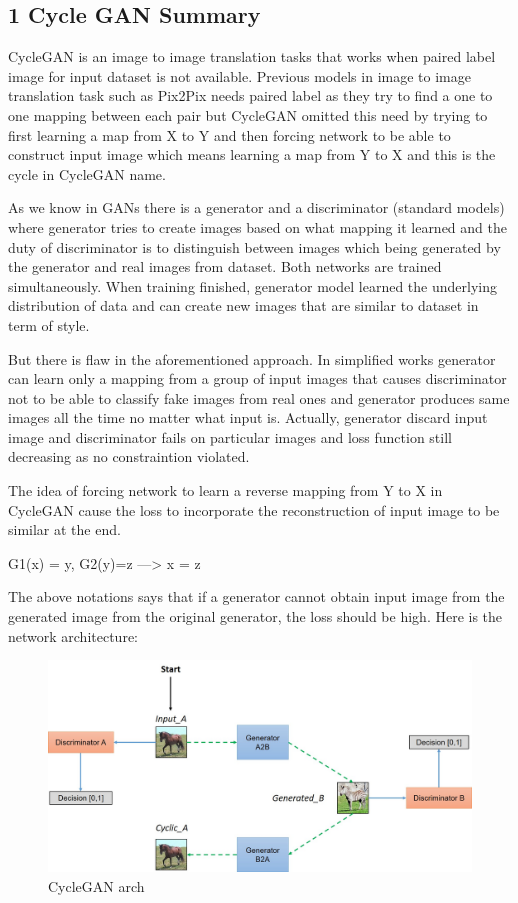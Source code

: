\documentclass[11pt]{article}
\makeatletter
\def\maxwidth{\ifdim\Gin@nat@width>\linewidth\linewidth
    \else\Gin@nat@width\fi}
\let\Oldincludegraphics\includegraphics
\renewcommand{\includegraphics}[1]{\Oldincludegraphics[width=.8\maxwidth]{#1}}
\makeatother
\begin{document}
    \hypertarget{cycle-gan-summary}{%
\subsection{1 Cycle GAN Summary}\label{cycle-gan-summary}}

CycleGAN is an image to image translation tasks that works when paired
label image for input dataset is not available. Previous models in image
to image translation task such as Pix2Pix needs paired label as they try
to find a one to one mapping between each pair but CycleGAN omitted this
need by trying to first learning a map from X to Y and then forcing
network to be able to construct input image which means learning a map
from Y to X and this is the cycle in CycleGAN name.

As we know in GANs there is a generator and a discriminator (standard
models) where generator tries to create images based on what mapping it
learned and the duty of discriminator is to distinguish between images
which being generated by the generator and real images from dataset.
Both networks are trained simultaneously. When training finished,
generator model learned the underlying distribution of data and can
create new images that are similar to dataset in term of style.

But there is flaw in the aforementioned approach. In simplified works
generator can learn only a mapping from a group of input images that
causes discriminator not to be able to classify fake images from real
ones and generator produces same images all the time no matter what
input is. Actually, generator discard input image and discriminator
fails on particular images and loss function still decreasing as no
constraintion violated.

The idea of forcing network to learn a reverse mapping from Y to X in
CycleGAN cause the loss to incorporate the reconstruction of input image
to be similar at the end.

G1(x) = y, G2(y)=z ---\textgreater{} x = z

The above notations says that if a generator cannot obtain input image
from the generated image from the original generator, the loss should be
high. Here is the network architecture:

\begin{figure}
\centering
\includegraphics{wiki/3_5.jpg}
\caption{CycleGAN arch}
\end{figure}
\end{document}
